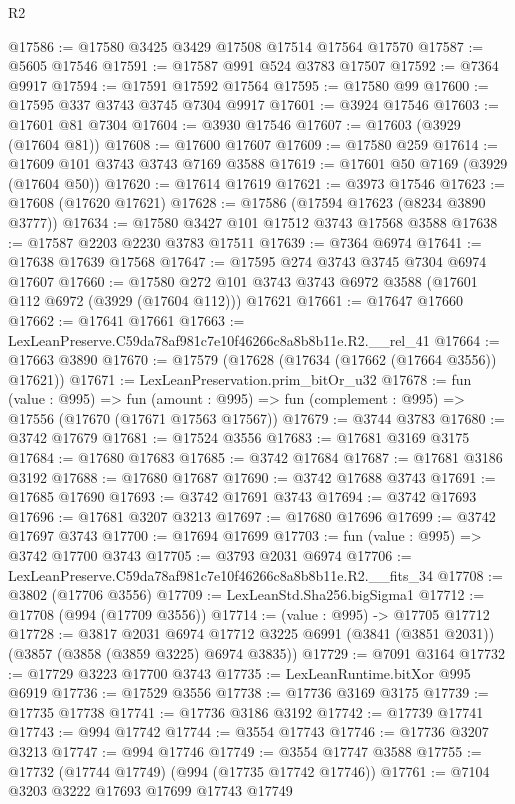 \begin{lexlean}{R2}
\begin{coremodule}
@17586 := @17580 @3425 @3429 @17508 @17514 @17564 @17570
@17587 := @5605 @17546
@17591 := @17587 @991 @524 @3783 @17507
@17592 := @7364 @9917
@17594 := @17591 @17592 @17564
@17595 := @17580 @99
@17600 := @17595 @337 @3743 @3745 @7304 @9917
@17601 := @3924 @17546
@17603 := @17601 @81 @7304
@17604 := @3930 @17546
@17607 := @17603 (@3929 (@17604 @81))
@17608 := @17600 @17607
@17609 := @17580 @259
@17614 := @17609 @101 @3743 @3743 @7169 @3588
@17619 := @17601 @50 @7169 (@3929 (@17604 @50))
@17620 := @17614 @17619
@17621 := @3973 @17546
@17623 := @17608 (@17620 @17621)
@17628 := @17586 (@17594 @17623 (@8234 @3890 @3777))
@17634 := @17580 @3427 @101 @17512 @3743 @17568 @3588
@17638 := @17587 @2203 @2230 @3783 @17511
@17639 := @7364 @6974
@17641 := @17638 @17639 @17568
@17647 := @17595 @274 @3743 @3745 @7304 @6974 @17607
@17660 := @17580 @272 @101 @3743 @3743 @6972 @3588 (@17601 @112 @6972 (@3929 (@17604 @112))) @17621
@17661 := @17647 @17660
@17662 := @17641 @17661
@17663 := LexLeanPreserve.C59da78af981c7e10f46266c8a8b8b11e.R2.__rel_41
@17664 := @17663 @3890
@17670 := @17579 (@17628 (@17634 (@17662 (@17664 @3556)) @17621))
@17671 := LexLeanPreservation.prim_bitOr_u32
@17678 := fun (value : @995) =>
  fun (amount : @995) => fun (complement : @995) => @17556 (@17670 (@17671 @17563 @17567))
@17679 := @3744 @3783
@17680 := @3742 @17679
@17681 := @17524 @3556
@17683 := @17681 @3169 @3175
@17684 := @17680 @17683
@17685 := @3742 @17684
@17687 := @17681 @3186 @3192
@17688 := @17680 @17687
@17690 := @3742 @17688 @3743
@17691 := @17685 @17690
@17693 := @3742 @17691 @3743
@17694 := @3742 @17693
@17696 := @17681 @3207 @3213
@17697 := @17680 @17696
@17699 := @3742 @17697 @3743
@17700 := @17694 @17699
@17703 := fun (value : @995) => @3742 @17700 @3743
@17705 := @3793 @2031 @6974
@17706 := LexLeanPreserve.C59da78af981c7e10f46266c8a8b8b11e.R2.__fits_34
@17708 := @3802 (@17706 @3556)
@17709 := LexLeanStd.Sha256.bigSigma1
@17712 := @17708 (@994 (@17709 @3556))
@17714 := (value : @995) -> @17705 @17712
@17728 := @3817
    @2031
    @6974
    @17712
    @3225
    @6991
    (@3841 (@3851 @2031))
    (@3857 (@3858 (@3859 @3225) @6974 @3835))
@17729 := @7091 @3164
@17732 := @17729 @3223 @17700 @3743
@17735 := LexLeanRuntime.bitXor @995 @6919
@17736 := @17529 @3556
@17738 := @17736 @3169 @3175
@17739 := @17735 @17738
@17741 := @17736 @3186 @3192
@17742 := @17739 @17741
@17743 := @994 @17742
@17744 := @3554 @17743
@17746 := @17736 @3207 @3213
@17747 := @994 @17746
@17749 := @3554 @17747 @3588
@17755 := @17732 (@17744 @17749) (@994 (@17735 @17742 @17746))
@17761 := @7104 @3203 @3222 @17693 @17699 @17743 @17749

\end{coremodule}
\end{lexlean}
